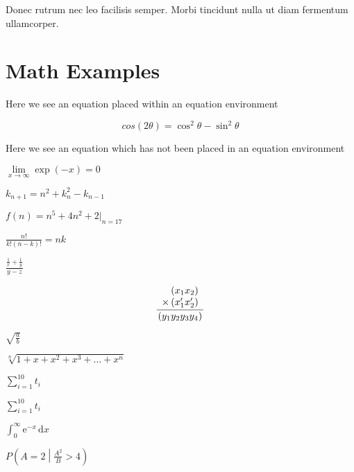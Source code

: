 \begin{theorem}
Donec rutrum nec leo facilisis semper. Morbi tincidunt nulla ut diam fermentum ullamcorper.
\end{theorem}

\section{Math Examples}

Here we see an equation placed within an equation environment\par
\begin{equation}
cos (2\theta) = \cos^2 \theta - \sin^2 \theta
\end{equation}

Here we see an equation which has not been placed in an equation environment\par
$
\lim\limits_{x \to \infty} \exp(-x) = 0
$

$
k_{n+1} = n^2 + k_n^2 - k_{n-1}
$

$
f(n) = n^5 + 4n^2 + 2 |_{n=17}
$

$
\frac{n!}{k!(n-k)!} = {n}{k}
$

$\frac{\frac{1}{x}+\frac{1}{y}}{y-z}$

\begin{equation}
\frac{
    \begin{array}[b]{r}
      \left( x_1 x_2 \right)\\
      \times \left( x'_1 x'_2 \right)
    \end{array}
  }{
    \left( y_1y_2y_3y_4 \right)
  }
\end{equation}

$\sqrt{\frac{a}{b}}$

$\sqrt[n]{1+x+x^2+x^3+\dots+x^n}$

$\sum_{i=1}^{10} t_i$

$\displaystyle\sum_{i=1}^{10} t_i$

$\int_0^\infty \mathrm{e}^{-x}\,\mathrm{d}x$

$P\left(A=2\middle|\frac{A^2}{B}>4\right)$

